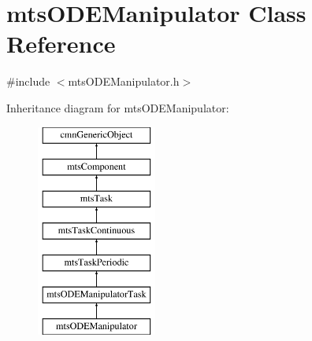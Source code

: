 \hypertarget{classmts_o_d_e_manipulator}{\section{mts\-O\-D\-E\-Manipulator Class Reference}
\label{classmts_o_d_e_manipulator}
}


{\ttfamily \#include $<$mts\-O\-D\-E\-Manipulator.\-h$>$}

Inheritance diagram for mts\-O\-D\-E\-Manipulator\-:\begin{figure}[H]
\begin{center}
\leavevmode
\includegraphics[height=7.000000cm]{de/d46/classmts_o_d_e_manipulator}
\end{center}
\end{figure}
